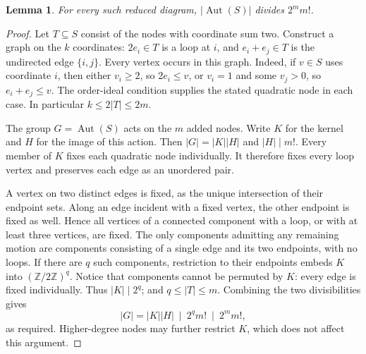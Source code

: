 \documentclass[11pt]{article}
\newtheorem{lemma}[theorem]{Lemma}
\newcommand{\Aut}{\operatorname{Aut}}
\begin{document}
\begin{lemma}\label{group}
For every such reduced diagram, $|\Aut(S)|$ divides $2^m m!$.
\end{lemma}
\begin{proof}
Let $T\subseteq S$ consist of the nodes with coordinate sum two. Construct a
graph on the $k$ coordinates: $2e_i\in T$ is a loop at $i$, and
$e_i+e_j\in T$ is the undirected edge $\{i,j\}$. Every vertex occurs in this
graph. Indeed, if $v\in S$ uses coordinate $i$, then either $v_i\geq2$, so
$2e_i\leq v$, or $v_i=1$ and some $v_j>0$, so $e_i+e_j\leq v$.
The order-ideal condition supplies the stated quadratic node in each case.
In particular $k\leq2|T|\leq2m$.

The group $G=\Aut(S)$ acts on the $m$ added nodes. Write $K$ for the kernel
and $H$ for the image of this action. Then $|G|=|K||H|$ and $|H|\mid m!$.
Every member of $K$ fixes each quadratic node individually. It therefore fixes
every loop vertex and preserves each edge as an unordered pair.

A vertex on two distinct edges is fixed, as the unique intersection of their
endpoint sets. Along an edge incident with a fixed vertex, the other endpoint
is fixed as well. Hence all vertices of a connected component with a loop,
or with at least three vertices, are fixed. The only components admitting
any remaining motion are components consisting of a single edge and its two
endpoints, with no loops. If there are $q$ such components, restriction to
their endpoints embeds $K$ into $(\mathbb Z/2\mathbb Z)^q$. Notice that
components cannot be permuted by $K$: every edge is fixed individually.
Thus $|K|\mid2^q$; and $q\leq|T|\leq m$. Combining the two divisibilities gives
\[
 |G|=|K||H|\ \mid\ 2^q m!\ \mid\ 2^m m!,
\]
as required. Higher-degree nodes may further restrict $K$, which does not
affect this argument.
\end{proof}
\end{document}

